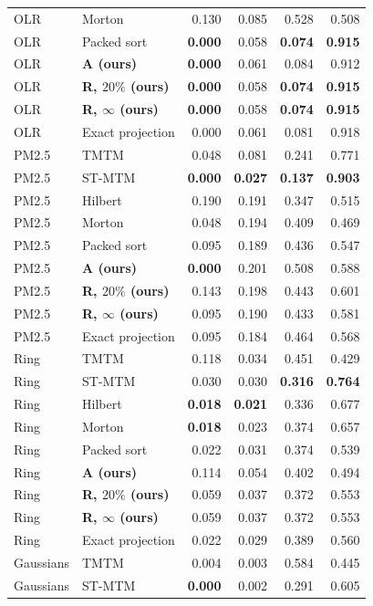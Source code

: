 \begin{longtable}{llrrrr}
OLR & Morton & 0.130 & 0.085 & 0.528 & 0.508\\
OLR & Packed sort & \textbf{0.000} & 0.058 & \textbf{0.074} & \textbf{0.915}\\
OLR & \textbf{A (ours)} & \textbf{0.000} & 0.061 & 0.084 & 0.912\\
OLR & \textbf{R, $20\%$ (ours)} & \textbf{0.000} & 0.058 & \textbf{0.074} & \textbf{0.915}\\
OLR & \textbf{R, $\infty$ (ours)} & \textbf{0.000} & 0.058 & \textbf{0.074} & \textbf{0.915}\\
OLR & Exact projection & 0.000 & 0.061 & 0.081 & 0.918\\
PM2.5 & TMTM & 0.048 & 0.081 & 0.241 & 0.771\\
PM2.5 & ST-MTM & \textbf{0.000} & \textbf{0.027} & \textbf{0.137} & \textbf{0.903}\\
PM2.5 & Hilbert & 0.190 & 0.191 & 0.347 & 0.515\\
PM2.5 & Morton & 0.048 & 0.194 & 0.409 & 0.469\\
PM2.5 & Packed sort & 0.095 & 0.189 & 0.436 & 0.547\\
PM2.5 & \textbf{A (ours)} & \textbf{0.000} & 0.201 & 0.508 & 0.588\\
PM2.5 & \textbf{R, $20\%$ (ours)} & 0.143 & 0.198 & 0.443 & 0.601\\
PM2.5 & \textbf{R, $\infty$ (ours)} & 0.095 & 0.190 & 0.433 & 0.581\\
PM2.5 & Exact projection & 0.095 & 0.184 & 0.464 & 0.568\\
Ring & TMTM & 0.118 & 0.034 & 0.451 & 0.429\\
Ring & ST-MTM & 0.030 & 0.030 & \textbf{0.316} & \textbf{0.764}\\
Ring & Hilbert & \textbf{0.018} & \textbf{0.021} & 0.336 & 0.677\\
Ring & Morton & \textbf{0.018} & 0.023 & 0.374 & 0.657\\
Ring & Packed sort & 0.022 & 0.031 & 0.374 & 0.539\\
Ring & \textbf{A (ours)} & 0.114 & 0.054 & 0.402 & 0.494\\
Ring & \textbf{R, $20\%$ (ours)} & 0.059 & 0.037 & 0.372 & 0.553\\
Ring & \textbf{R, $\infty$ (ours)} & 0.059 & 0.037 & 0.372 & 0.553\\
Ring & Exact projection & 0.022 & 0.029 & 0.389 & 0.560\\
Gaussians & TMTM & 0.004 & 0.003 & 0.584 & 0.445\\
Gaussians & ST-MTM & \textbf{0.000} & 0.002 & 0.291 & 0.605\\

\end{longtable}
